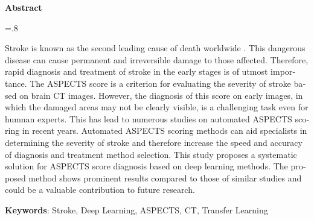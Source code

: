 


\pagestyle{empty}

\begin{latin}

\begin{center}
\textbf{Abstract}
\end{center}
\baselineskip=.8\baselineskip

Stroke is known as the second leading cause of death worldwide \cite{donkor2018stroke}.
This dangerous disease can cause permanent and irreversible damage to those affected.
Therefore, rapid diagnosis and treatment of stroke in the early stages is of utmost importance.
The ASPECTS score is a criterion for evaluating the severity of stroke based on brain CT images.
However, the diagnosis of this score on early images, in which the damaged areas may not be clearly visible, is a challenging task even for humnan experts.
This has lead to numerous studies on automated ASPECTS scoring in recent years.
Automated ASPECTS scoring methods can aid specialists in determining the severity of stroke and therefore increase the speed and accuracy of diagnosis and treatment method selection.
This study proposes a systematic solution for ASPECTS score diagnosis based on deep learning methods.
The proposed method shows prominent results compared to those of similar studies and could be a valuable contribution to future research.

\bigskip\noindent\textbf{Keywords}:
Stroke, Deep Learning, ASPECTS, CT, Transfer Learning

\end{latin}
